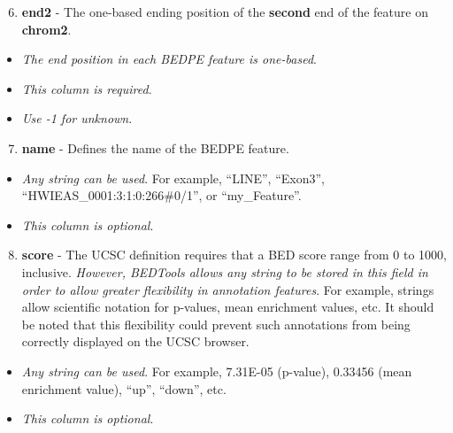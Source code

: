 \documentclass[letterpaper,10pt,english]{sphinxmanual}
\begin{document}
\begin{enumerate}
\setcounter{enumi}{5}
\item {} 
\textbf{end2} - The one-based ending position of the \textbf{second} end of the feature on \textbf{chrom2}.

\end{enumerate}
\begin{itemize}
\item {} 
\emph{The end position in each BEDPE feature is one-based}.

\item {} 
\emph{This column is required}.

\item {} 
\emph{Use -1 for unknown}.

\end{itemize}
\begin{enumerate}
\setcounter{enumi}{6}
\item {} 
\textbf{name} - Defines the name of the BEDPE feature.

\end{enumerate}
\begin{itemize}
\item {} 
\emph{Any string can be used}. For example, ``LINE'', ``Exon3'', ``HWIEAS\_0001:3:1:0:266\#0/1'', or ``my\_Feature''.

\item {} 
\emph{This column is optional}.

\end{itemize}
\begin{enumerate}
\setcounter{enumi}{7}
\item {} 
\textbf{score} - The UCSC definition requires that a BED score range from 0 to 1000, inclusive. \emph{However, BEDTools allows any string to be stored in this field in order to allow greater flexibility in annotation features}. For example, strings allow scientific notation for p-values, mean enrichment values, etc. It should be noted that this flexibility could prevent such annotations from being correctly displayed on the UCSC browser.

\end{enumerate}
\begin{itemize}
\item {} 
\emph{Any string can be used}. For example, 7.31E-05 (p-value), 0.33456 (mean enrichment value), ``up'', ``down'', etc.

\item {} 
\emph{This column is optional}.

\end{itemize}
\end{document}
